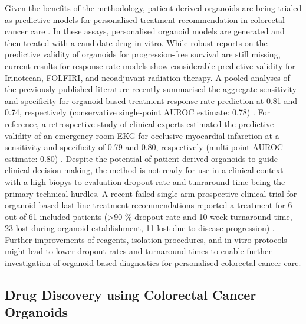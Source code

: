 \begin{flushleft}
Given the benefits of the methodology, patient derived organoids are being trialed as predictive models for personalised treatment recommendation in colorectal cancer care \cite{VanDeWetering2015, Vlachogiannis2018, ganeshRectalCancerOrganoid2019a, ooftPatientderivedOrganoidsCan2019a, yaoPatientDerivedOrganoidsPredict2020a}. In these assays, personalised organoid models are generated and then treated with a candidate drug in-vitro. While robust reports on the predictive validity of organoids for progression-free survival are still missing, current results for response rate models show considerable predictive validity for Irinotecan, FOLFIRI, and neoadjuvant radiation therapy. A pooled analyses of the previously published literature recently summarised the aggregate sensitivity and specificity for organoid based treatment response rate prediction at 0.81 and 0.74, respectively (conservative single-point AUROC estimate: 0.78) \cite{wensinkPatientderivedOrganoidsPredictive2021, zhangNoteROCAnalysis2005}. For reference, a retrospective study of clinical experts estimated the predictive validity of an emergency room EKG for occlusive myocardial infarction at a sensitivity and specificity of 0.79 and 0.80, respectively (multi-point AUROC estimate: 0.80) \cite{al-zaitiMachineLearningECG2023}. Despite the potential of patient derived organoids to guide clinical decision making, the method is not ready for use in a clinical context with a high biopys-to-evaluation dropout rate and tunraround time being the primary technical hurdles. A recent failed single-arm prospective clinical trial for organoid-based last-line treatment recommendations reported a treatment for 6 out of 61 included patients (>90 \% dropout rate and 10 week turnaround time, 23 lost during organoid establishment, 11 lost due to disease progression) \cite{ooftProspectiveExperimentalTreatment2021}. Further improvements of reagents, isolation procedures, and in-vitro protocols might lead to lower dropout rates and turnaround times to enable further investigation of organoid-based diagnostics for personalised colorectal cancer care. \par

\subsection{Drug Discovery using Colorectal Cancer Organoids}


\end{flushleft}
